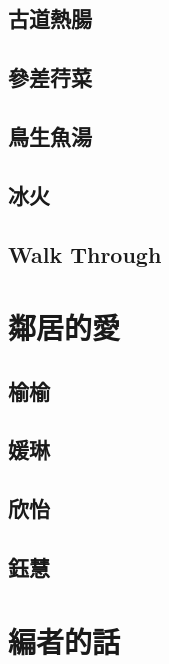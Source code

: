 \documentclass[hyperref]{ctexbook}
\begin{document}
\chapter{古道熱腸}
\chapter{參差荇菜}
\chapter{鳥生魚湯}
\chapter{冰火}
\chapter{Walk Through}

\part{鄰居的愛}
\chapter{榆榆}
\chapter{媛琳}
\chapter{欣怡}
\chapter{鈺慧}

\part{編者的話}

\end{document}
